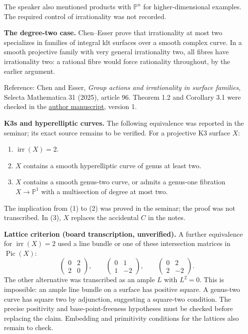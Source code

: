 \medskip\noindent
The speaker also mentioned products with
$\mathbb{P}^n$ for higher-dimensional
examples. The required control of
irrationality was not recorded.

\medskip\noindent
{\bf The degree-two case.}
Chen--Esser prove that irrationality
at most two specializes in families
of integral klt surfaces over a smooth
complex curve. In a smooth projective
family with very general irrationality
two, all fibres have irrationality two:
a rational fibre would force rationality
throughout, by the earlier argument.

Reference: Chen and Esser,
{\it Group actions and irrationality
in surface families},
Selecta Mathematica 31 (2025), article 96.
Theorem 1.2 and Corollary 3.1 were
checked in the
\href{https://arxiv.org/abs/2410.18427}
{author manuscript}, version 1.

\medskip\noindent
{\bf K3s and hyperelliptic curves.}
The following equivalence was reported
in the seminar; its exact source
remains to be verified.
For a projective K3 surface $X$:
\begin{enumerate}
\item $\operatorname{irr}(X)=2$.
\item $X$ contains a smooth hyperelliptic
curve of genus at least two.
\item $X$ contains a smooth genus-two
curve, or admits a genus-one fibration
$X\to\mathbb{P}^1$ with a multisection
of degree at most two.
\end{enumerate}
The implication from (1) to (2) was
proved in the seminar; the proof was
not transcribed. In (3), $X$ replaces
the accidental $C$ in the notes.

\medskip\noindent
{\bf Lattice criterion
(board transcription, unverified).}
A further equivalence for
$\operatorname{irr}(X)=2$ used a line
bundle or one of these intersection
matrices in $\operatorname{Pic}(X)$:
$$
\begin{pmatrix}0&2\\2&0\end{pmatrix},
\qquad
\begin{pmatrix}0&1\\1&-2\end{pmatrix},
\qquad
\begin{pmatrix}0&2\\2&-2\end{pmatrix}.
$$
The other alternative was transcribed
as an ample $L$ with $L^2=0$.
This is impossible: an ample line
bundle on a surface has positive square.
A genus-two curve has square two by
adjunction, suggesting a square-two
condition. The precise positivity and
base-point-freeness hypotheses must
be checked before replacing the claim.
Embedding and primitivity conditions
for the lattices also remain to check.

